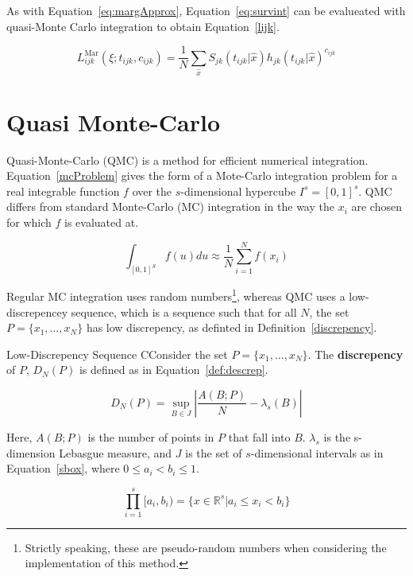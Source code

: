 As with Equation~\ref{eq:margApprox}, Equation~\ref{eq:survint} can be evalueated with quasi-Monte Carlo integration to obtain Equation~\ref{lijk}. 

\begin{equation}
    L_{ijk}^{\text{Mar}}(\xi; t_{ijk}, c_{ijk}) = \frac{1}{N}\sum_{\hat{x}}S_{jk}(t_{ijk}|\hat{x})h_{jk}(t_{ijk}|\hat{x})^{c_{ijk}}
    \label{lijk}
\end{equation}

\section{Quasi Monte-Carlo}\label{qmcSec}
Quasi-Monte-Carlo (QMC) is a method for efficient numerical integration. Equation~\ref{mcProblem} gives the form of a Mote-Carlo integration problem for a real integrable function $f$ over the $s$-dimensional hypercube $I^s = [0,1]^s$. QMC differs from standard Monte-Carlo (MC) integration in the way the $x_i$ are chosen for which $f$ is evaluated at. 

\begin{equation}
    \int_{[0,1]^S}f(u)du \approx \frac{1}{N}\sum_{i = 1}^{N}f(x_i)
    \label{mcProblem}
\end{equation}

Regular MC integration uses random numbers\footnote{Strictly speaking, these are pseudo-random numbers when considering the implementation of this method.}, whereas QMC uses a low-discrepencey sequence, which is a sequence such that for all $N$, the set $P = \{x_1, \ldots, x_N\}$ has low discrepency, as definted in Definition~\ref{discrepency}.

\begin{definition}[label=discrepency]{Low-Discrepency Sequence}
    CConsider the set $P = \{x_1, \ldots, x_N\}$. The \textbf{discrepency} of $P$, $D_N(P)$ is defined as in Equation~\ref{def:descrep}.

    \begin{equation}
        D_N(P) = \sup_{B \in J}\left|\frac{A(B;P)}{N} - \lambda_s(B)\right|
        \label{def:descrep}
    \end{equation}

    Here, $A(B;P)$ is the number of points in $P$ that fall into $B$. $\lambda_s$ is the s-dimension Lebasgue measure, and $J$ is the set of $s$-dimensional intervals as in Equation~\ref{sbox}, where $0 \leq a_i < b_i \leq 1$.
    
    \begin{equation}
        \prod_{i = 1}^{s} [a_i,b_i) = \{x \in \mathbb{R}^s | a_i \leq x_i < b_i \}
        \label{sbox}
    \end{equation}
\end{definition}

